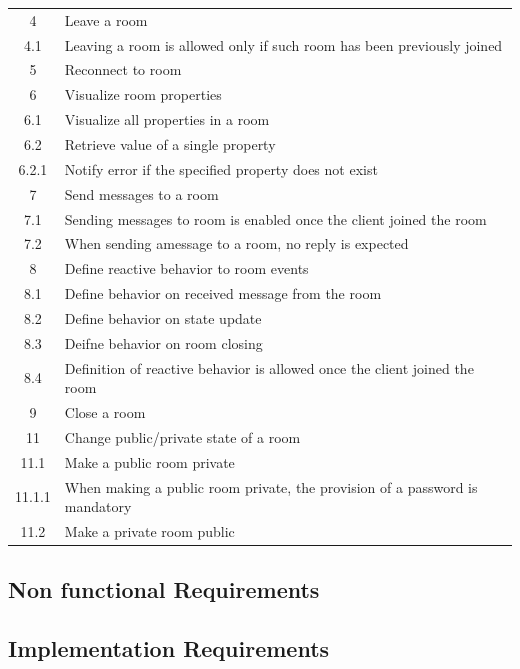 \begin{center}
\begin{longtable}{|c|l|}
4       & Leave a room \\
4.1     & Leaving a room is allowed only if such room has been previously joined \\
5       & Reconnect to room \\
6       & Visualize room properties \\
6.1     & Visualize all properties in a room \\
6.2     & Retrieve value of a single property \\
6.2.1   & Notify error if the specified property does not exist \\
7       & Send messages to a room \\
7.1     & Sending messages to room is enabled once the client joined the room \\
7.2     & When sending amessage to a room, no reply is expected \\
8       & Define reactive behavior to room events \\
8.1     & Define behavior on received message from the room \\
8.2     & Define behavior on state update \\
8.3     & Deifne behavior on room closing \\
8.4     & Definition of reactive behavior is allowed once the client joined the room \\
9       & Close a room \\
11      & Change public/private state of a room \\
11.1    & Make a public room private \\
11.1.1  & When making a public room private, the provision of a password is mandatory \\ 
11.2    & Make a private room public \\
\hline

\end{longtable}
\end{center}


\subsection{Non functional Requirements} 
 
\subsection{Implementation Requirements}
 
 
 
 

 